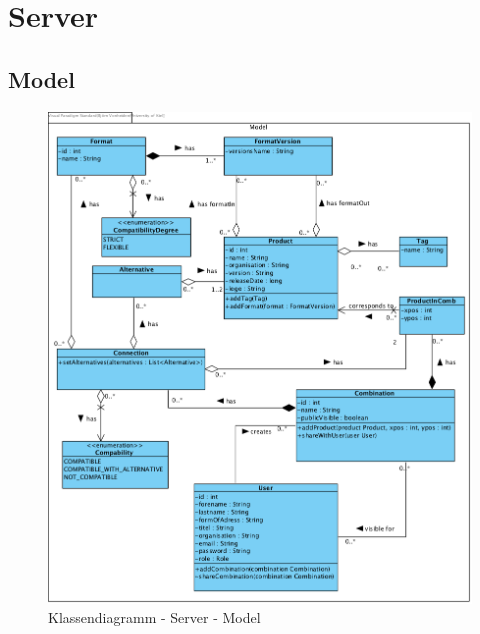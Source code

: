 \section{Server}
\subsection{Model}
\begin{figure}[h]
	\centering
	\includegraphics[width=\textwidth]{klassendiagramm/Model}
	\caption{Klassendiagramm - Server - Model}
	\label{fig:klassendiagramm-server-model}
\end{figure}
